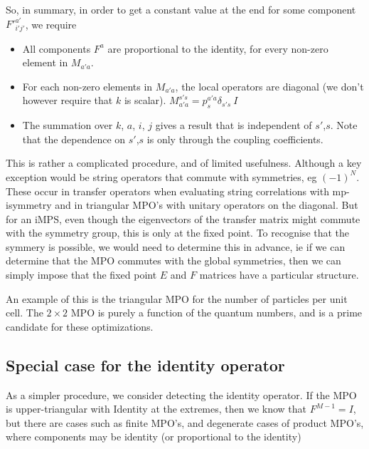 \documentclass{article}[10pt]
\begin{document}
So, in summary, in order to get a constant value at the end for some component $F'^{a'}_{i'j'}$, we require
\begin{itemize}
\item All components $F^a$ are proportional to the identity, for every non-zero element in $M_{a'a}$.
\item For each non-zero elements in $M_{a'a}$, the local operators are diagonal (we don't however require that $k$ is scalar).
$M_{a'a}^{s's} = p^{a'a}_{s} \delta_{s's} \: I$
\item The summation over $k$, $a$, $i$, $j$ gives a result that is independent of $s'$,$s$. Note that the dependence
on $s'$,$s$ is only through the coupling coefficients.
\end{itemize}

This is rather a complicated procedure, and of limited usefulness. Although a key exception would be string
operators that commute with symmetries, eg $(-1)^N$. These occur in transfer operators when evaluating string
correlations with mp-isymmetry and in triangular MPO's with unitary operators on the diagonal. But for an iMPS,
even though the eigenvectors of the transfer matrix might commute with the symmetry group, this is only at the
fixed point. To recognise that the symmery is possible, we would need to determine this in advance, ie if we
can determine that the MPO commutes with the global symmetries, then we can simply impose that the fixed point
$E$ and $F$ matrices have a particular structure. 

An example of this is the triangular MPO for the number of particles per unit cell. The $2 \times 2$ MPO is purely
a function of the quantum numbers, and is a prime candidate for these optimizations.  

\subsection{Special case for the identity operator}

As a simpler procedure, we consider detecting the identity operator. If the MPO is upper-triangular with Identity at
the extremes, then we know that $F^{M-1} = I$, but there are cases such as finite MPO's, and degenerate cases of
product MPO's, where components may be identity (or proportional to the identity) 
\end{document}
